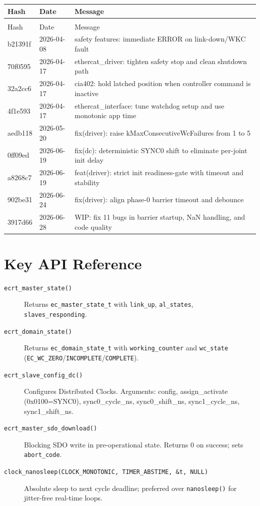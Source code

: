 \documentclass[11pt,a4paper]{article}
\begin{document}
\begin{longtable}{@{}>{\ttfamily\small}l >{\small}l p{9cm}@{}}
  \toprule
  \normalfont Hash & \normalfont Date & \normalfont Message \\
  \midrule
  \endfirsthead
  \multicolumn{3}{c}{\small\itshape (continued)} \\
  \toprule
  \normalfont Hash & \normalfont Date & \normalfont Message \\
  \midrule
  \endhead
  \bottomrule
  \endlastfoot
  b21391f & 2026-04-08 & safety features: immediate ERROR on link-down/WKC fault \\
  70f0595 & 2026-04-17 & ethercat\_driver: tighten safety stop and clean shutdown path \\
  32a2cc6 & 2026-04-17 & cia402: hold latched position when controller command is inactive \\
  4f1e593 & 2026-04-17 & ethercat\_interface: tune watchdog setup and use monotonic app time \\
  aedb118 & 2026-05-20 & fix(driver): raise kMaxConsecutiveWcFailures from 1 to 5 \\
  0ff09ed & 2026-06-19 & fix(dc): deterministic SYNC0 shift to eliminate per-joint init delay \\
  a8268c7 & 2026-06-19 & feat(driver): strict init readiness-gate with timeout and stability \\
  902be31 & 2026-06-24 & fix(driver): align phase-0 barrier timeout and debounce \\
  3917d66 & 2026-06-28 & WIP: fix 11 bugs in barrier startup, NaN handling, and code quality \\
\end{longtable}

\section{Key API Reference}
\label{app:api}

\begin{description}
  \item[\texttt{ecrt\_master\_state()}] Returns \texttt{ec\_master\_state\_t}
        with \texttt{link\_up}, \texttt{al\_states}, \texttt{slaves\_responding}.
  \item[\texttt{ecrt\_domain\_state()}] Returns \texttt{ec\_domain\_state\_t}
        with \texttt{working\_counter} and \texttt{wc\_state}
        (\texttt{EC\_WC\_ZERO}/\texttt{INCOMPLETE}/\texttt{COMPLETE}).
  \item[\texttt{ecrt\_slave\_config\_dc()}] Configures Distributed Clocks.
        Arguments: config, assign\_activate (0x0100=SYNC0),
        sync0\_cycle\_ns, sync0\_shift\_ns, sync1\_cycle\_ns, sync1\_shift\_ns.
  \item[\texttt{ecrt\_master\_sdo\_download()}] Blocking SDO write in
        pre-operational state.  Returns 0 on success; sets \texttt{abort\_code}.
  \item[\texttt{clock\_nanosleep(CLOCK\_MONOTONIC, TIMER\_ABSTIME, \&t, NULL)}]
        Absolute sleep to next cycle deadline; preferred over
        \texttt{nanosleep()} for jitter-free real-time loops.
\end{description}
\end{document}
